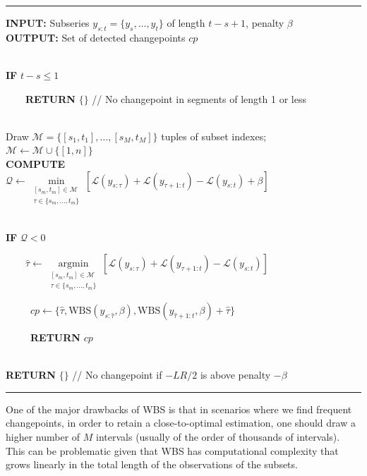 \documentclass[
  letterpaper,
  DIV=11,
  numbers=noendperiod]{scrreprt}
\begin{document}
\begin{center}\rule{0.5\linewidth}{0.5pt}\end{center}

\textbf{INPUT:} Subseries \(y_{s:t} = \{y_s, \dots, y_t\}\) of length
\(t - s + 1\), penalty \(\beta\)\\
\textbf{OUTPUT:} Set of detected changepoints \(cp\)\\
\strut \\
\textbf{IF} \(t - s \leq 1\)\\
\strut ~~~~\textbf{RETURN} \(\{\}\) // No changepoint in segments of
length 1 or less\\
\strut \\
Draw \(\mathcal{M} = \{ [s_1, t_1], \dots, [s_M, t_M] \}\) tuples of
subset indexes;\\
\(\mathcal{M} \leftarrow \mathcal{M} \cup \{[1, n]\}\)\\
\textbf{COMPUTE}\\
\(\mathcal{Q} \leftarrow \underset{\substack{[s_m, t_m] \in \mathcal{M}\\ \tau \in \{s_m, \dots, t_m\}}}{\min} \left[ \mathcal{L}(y_{s:\tau}) + \mathcal{L}(y_{\tau+1:t}) - \mathcal{L}(y_{s:t}) + \beta \right]\)\\
\strut \\
\textbf{IF} \(\mathcal{Q} < 0\)\\
\strut ~~~~\(\hat{\tau} \leftarrow \underset{\substack{[s_m, t_m] \in \mathcal{M}\\ \tau \in \{s_m, \dots, t_m\}}}{\text{arg}\min} \left[ \mathcal{L}(y_{s:\tau}) + \mathcal{L}(y_{\tau+1:t}) - \mathcal{L}(y_{s:t}) \right]\)\\
\strut ~~~~~\(cp \leftarrow \{ \hat{\tau}, \text{WBS}(y_{s:\hat{\tau}}, \beta), \text{WBS}(y_{\hat{\tau}+1:t}, \beta) + \hat\tau \}\)\\
\strut ~~~~~\textbf{RETURN} \(cp\)\\
\strut \\
\textbf{RETURN} \(\{\}\) // No changepoint if \(-LR/2\) is above penalty
\(- \beta\)

\begin{center}\rule{0.5\linewidth}{0.5pt}\end{center}

One of the major drawbacks of WBS is that in scenarios where we find
frequent changepoints, in order to retain a close-to-optimal estimation,
one should draw a higher number of \(M\) intervals (usually of the order
of thousands of intervals). This can be problematic given that WBS has
computational complexity that grows linearly in the total length of the
observations of the subsets.
\end{document}
